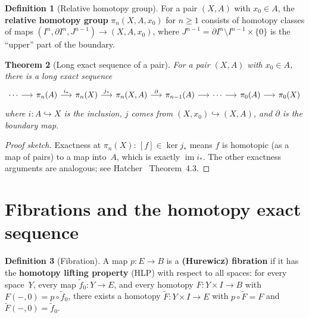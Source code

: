 \documentclass[12pt,a4paper,openany]{book}
\theoremstyle{definition}
\newtheorem{definition}{Definition}[chapter]
\theoremstyle{plain}
\newtheorem{theorem}[definition]{Theorem}
\theoremstyle{remark}
\DeclareMathOperator{\im}{im}
\begin{document}
\begin{definition}[Relative homotopy group]
For a pair $(X,A)$ with $x_0\in A$, the \textbf{relative homotopy
group} $\pi_n(X,A,x_0)$ for $n\ge1$ consists of homotopy classes
of maps $(I^n,\partial I^n,J^{n-1})\to(X,A,x_0)$, where
$J^{n-1}=\partial I^n\setminus I^{n-1}\times\{0\}$ is the
``upper'' part of the boundary.
\end{definition}

\begin{theorem}[Long exact sequence of a pair]
\label{thm:les-homotopy}
For a pair $(X,A)$ with $x_0\in A$, there is a long exact sequence
\[
\begin{tikzcd}[column sep=1.4em]
  \cdots \ar[r]
  & \pi_n(A) \ar[r,"i_*"]
  & \pi_n(X) \ar[r,"j_*"]
  & \pi_n(X,A) \ar[r,"\partial"]
  & \pi_{n-1}(A) \ar[r]
  & \cdots \ar[r]
  & \pi_0(A) \ar[r]
  & \pi_0(X)
\end{tikzcd}
\]
where $i\colon A\hookrightarrow X$ is the inclusion, $j$ comes from
$(X,x_0)\hookrightarrow(X,A)$, and $\partial$ is the boundary map.
\end{theorem}

\begin{proof}[Proof sketch]
Exactness at $\pi_n(X)$: $[f]\in\ker j_*$ means $f$ is homotopic
(as a map of pairs) to a map into~$A$, which is exactly $\im i_*$.
The other exactness arguments are analogous; see
Hatcher~\cite{hatcher} Theorem~4.3.
\end{proof}

\section{Fibrations and the homotopy exact sequence}
\label{sec:fibrations}

\begin{definition}[Fibration]
A map $p\colon E\to B$ is a \textbf{(Hurewicz) fibration} if it has
the \textbf{homotopy lifting property} (HLP) with respect to all
spaces: for every space~$Y$, every map $\tilde f_0\colon Y\to E$,
and every homotopy $F\colon Y\times I\to B$ with
$F(-,0)=p\circ\tilde f_0$, there exists a homotopy
$\tilde F\colon Y\times I\to E$ with
$p\circ\tilde F=F$ and $\tilde F(-,0)=\tilde f_0$.
\end{definition}
\end{document}
